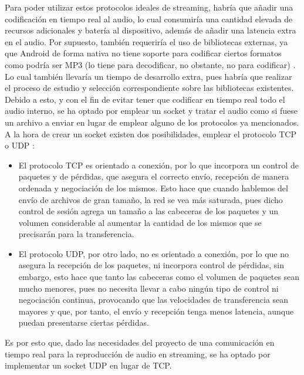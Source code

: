Para poder utilizar estos protocolos ideales de streaming, habría que añadir una
codificación en tiempo real al audio, lo cual consumiría una cantidad elevada de
recursos adicionales y batería al dispositivo, además de añadir una latencia
extra en el audio. Por supuesto, también requeriría el uso de bibliotecas
externas, ya que Android de forma nativa no tiene soporte para codificar ciertos
formatos como podría ser MP3 (lo tiene para decodificar, no obstante, no para
codificar) \cite{android-mp3}. Lo cual también llevaría un tiempo de desarrollo extra, pues habría
que realizar el proceso de estudio y selección correspondiente sobre las
bibliotecas existentes.\\

Debido a esto, y con el fin de evitar tener que codificar en tiempo real todo el
audio interno, se ha optado por emplear un socket \cite{protocolo-socket} y tratar el audio como si
fuese un archivo a enviar en lugar de emplear alguno de los protocolos ya
mencionados.\\

A la hora de crear un socket \cite{protocolo-socket} existen dos posibilidades,
emplear el protocolo TCP \cite{protocolo-tcp} o UDP \cite{protocolo-udp}:

\begin{itemize}
    \item El protocolo TCP es orientado a conexión, por lo que incorpora un
    control de paquetes y de pérdidas, que asegura el correcto envío, recepción
    de manera ordenada y negociación de los mismos. Esto hace que cuando
    hablemos del envío de archivos de gran tamaño, la red se vea más saturada,
    pues dicho control de sesión agrega un tamaño a las cabeceras de los
    paquetes y un volumen considerable al aumentar la cantidad de los mismos que
    se precisarán para la transferencia.
    \item El protocolo UDP, por otro lado, no es orientado a conexión, por lo
    que no asegura la recepción de los paquetes, ni incorpora control de
    pérdidas, sin embargo, esto hace que tanto las cabeceras como el volumen de
    paquetes sean mucho menores, pues no necesita llevar a cabo ningún tipo de
    control ni negociación continua, provocando que las velocidades de
    transferencia sean mayores y que, por tanto, el envío y recepción tenga
    menos latencia, aunque puedan presentarse ciertas pérdidas.
\end{itemize}


Es por esto que, dado las necesidades del proyecto de una comunicación en tiempo
real para la reproducción de audio en streaming, se ha optado por implementar un
socket UDP en lugar de TCP.\\

